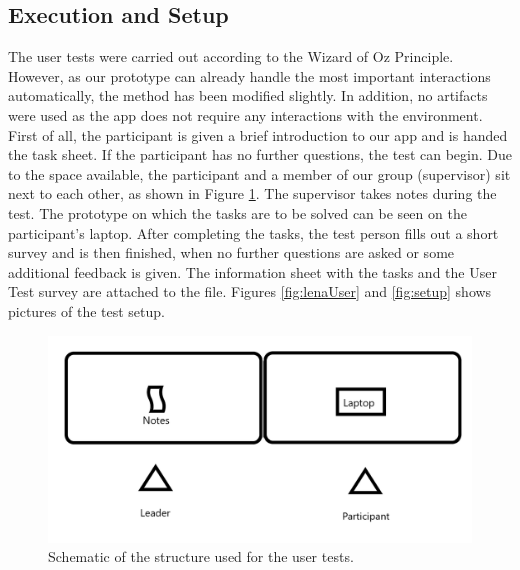 \documentclass[11pt]{article}
\begin{document}
\subsection{Execution and Setup}
The user tests were carried out according to the Wizard of Oz Principle. However, as our prototype can already handle the most important interactions automatically, the method has been modified slightly. In addition, no artifacts were used as the app does not require any interactions with the environment.\\
First of all, the participant is given a brief introduction to our app and is handed the task sheet. If the participant has no further questions, the test can begin. Due to the space available, the participant and a member of our group (supervisor) sit next to each other, as shown in Figure \ref{fig:test setup}. The supervisor takes notes during the test. The prototype on which the tasks are to be solved can be seen on the participant's laptop. After completing the tasks, the test person fills out a short survey and is then finished, when no further questions are asked or some additional feedback is given. The information sheet with the tasks and the User Test survey are attached to the file. Figures \ref{fig:lenaUser}  and \ref{fig:setup} shows pictures of the test setup. 
\begin{figure}[h!]
    \centering
    \includegraphics[width=0.8\linewidth]{figures/User Test Setup.png}
    \caption{Schematic of the structure used for the user tests.}
    \label{fig:test setup}
\end{figure}
\end{document}

